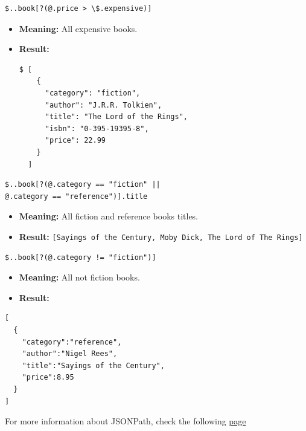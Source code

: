 \documentclass{article}
\newenvironment{codetemplate}[1][]{%
  \mybasecolorbox[#1]
  \itshape
}{%
  \endmybasecolorbox
}
\begin{document}
\begin{codetemplate}{}
\begin{verbatim}
$..book[?(@.price > \$.expensive)]
\end{verbatim}
\end{codetemplate}
\begin{itemize}
    \item \textbf{Meaning:} All expensive books.
    \item \textbf{Result:} 
\begin{verbatim}
$ [
    {
      "category": "fiction",
      "author": "J.R.R. Tolkien",
      "title": "The Lord of the Rings",
      "isbn": "0-395-19395-8",
      "price": 22.99
    }
  ]
\end{verbatim}
\end{itemize}

\begin{codetemplate}{}
\begin{verbatim}
$..book[?(@.category == "fiction" ||
@.category == "reference")].title
\end{verbatim}
\end{codetemplate}
\begin{itemize}
    \item \textbf{Meaning:} All fiction and reference books titles.
    \item \textbf{Result:} \verb|[Sayings of the Century, Moby Dick, The Lord of The Rings]|
\end{itemize}

\begin{codetemplate}{}
\begin{verbatim}
$..book[?(@.category != "fiction")]
\end{verbatim}
\end{codetemplate}
\begin{itemize}
    \item \textbf{Meaning:} All not fiction books.
    \item \textbf{Result:}
\end{itemize}
\begin{verbatim}
[
  {
    "category":"reference",
    "author":"Nigel Rees",
    "title":"Sayings of the Century",
    "price":8.95
  }
]
\end{verbatim}

For more information about JSONPath, check the following \href{https://support.smartbear.com/alertsite/docs/monitors/api/endpoint/jsonpath.html}{page}
\end{document}
